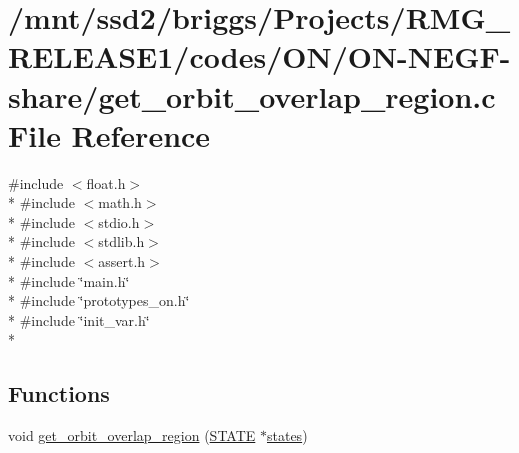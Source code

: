 \hypertarget{_o_n_2_o_n-_n_e_g_f-share_2get__orbit__overlap__region_8c}{\section{/mnt/ssd2/briggs/\-Projects/\-R\-M\-G\-\_\-\-R\-E\-L\-E\-A\-S\-E1/codes/\-O\-N/\-O\-N-\/\-N\-E\-G\-F-\/share/get\-\_\-orbit\-\_\-overlap\-\_\-region.c File Reference}
\label{_o_n_2_o_n-_n_e_g_f-share_2get__orbit__overlap__region_8c}
}
{\ttfamily \#include $<$float.\-h$>$}\\*
{\ttfamily \#include $<$math.\-h$>$}\\*
{\ttfamily \#include $<$stdio.\-h$>$}\\*
{\ttfamily \#include $<$stdlib.\-h$>$}\\*
{\ttfamily \#include $<$assert.\-h$>$}\\*
{\ttfamily \#include \char`\"{}main.\-h\char`\"{}}\\*
{\ttfamily \#include \char`\"{}prototypes\-\_\-on.\-h\char`\"{}}\\*
{\ttfamily \#include \char`\"{}init\-\_\-var.\-h\char`\"{}}\\*
\subsection*{Functions}
\begin{DoxyCompactItemize}
\item 
void \hyperlink{_o_n_2_o_n-_n_e_g_f-share_2get__orbit__overlap__region_8c_a5051cd09ff4c6830f7da4db5b063409e}{get\-\_\-orbit\-\_\-overlap\-\_\-region} (\hyperlink{struct_s_t_a_t_e}{S\-T\-A\-T\-E} $\ast$\hyperlink{md_8h_a286ebf6b996d2b1827eb9a889dfc83d7}{states})
\end{DoxyCompactItemize}


